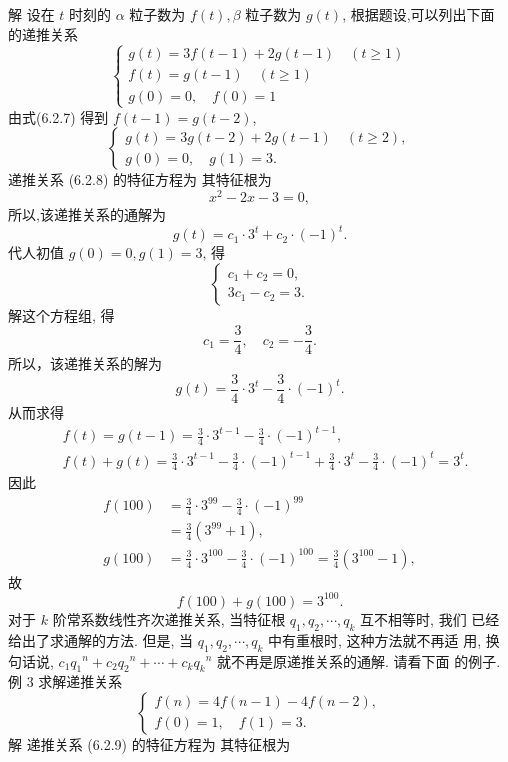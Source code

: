 \documentclass{report}
\begin{document}
	解 设在 $t$ 时刻的 $\alpha$ 粒子数为 $f(t), \beta$ 粒子数为 $g(t)$, 根据题设,可以列出下面 的递推关系
	$$
	\left\{\begin{array}{l}
	g(t)=3 f(t-1)+2 g(t-1) \quad(t \geqslant 1) \\
	f(t)=g(t-1) \quad(t \geqslant 1) \\
	g(0)=0, \quad f(0)=1
	\end{array}\right.
	$$
	由式(6.2.7) 得到
	$f(t-1)=g(t-2)$,
	$$
	\left\{\begin{array}{l}
	g(t)=3 g(t-2)+2 g(t-1) \quad(t \geqslant 2), \\
	g(0)=0, \quad g(1)=3 .
	\end{array}\right.
	$$
	递推关系 (6.2.8) 的特征方程为
	其特征根为
	$$
	x^2-2 x-3=0,
	$$
	所以,该递推关系的通解为
	$$
	g(t)=c_1 \cdot 3^t+c_2 \cdot(-1)^t .
	$$
	代人初值 $g(0)=0, g(1)=3$, 得
	$$
	\left\{\begin{array}{l}
	c_1+c_2=0, \\
	3 c_1-c_2=3 .
	\end{array}\right.
	$$
	解这个方程组, 得
	$$
	c_1=\frac{3}{4}, \quad c_2=-\frac{3}{4} .
	$$
	所以，该递推关系的解为
	$$
	g(t)=\frac{3}{4} \cdot 3^t-\frac{3}{4} \cdot(-1)^t .
	$$
	从而求得
	$$
	\begin{aligned}
	&f(t)=g(t-1)=\frac{3}{4} \cdot 3^{t-1}-\frac{3}{4} \cdot(-1)^{t-1}, \\
	&f(t)+g(t)=\frac{3}{4} \cdot 3^{t-1}-\frac{3}{4} \cdot(-1)^{t-1}+\frac{3}{4} \cdot 3^t-\frac{3}{4} \cdot(-1)^t=3^t .
	\end{aligned}
	$$
	因此
	$$
	\begin{aligned}
	f(100) &=\frac{3}{4} \cdot 3^{99}-\frac{3}{4} \cdot(-1)^{99} \\
	&=\frac{3}{4}\left(3^{99}+1\right), \\
	g(100) &=\frac{3}{4} \cdot 3^{100}-\frac{3}{4} \cdot(-1)^{100}=\frac{3}{4}\left(3^{100}-1\right),
	\end{aligned}
	$$故
	$$
	f(100)+g(100)=3^{100} .
	$$
	对于 $k$ 阶常系数线性齐次递推关系, 当特征根 $q_1, q_2, \cdots, q_k$ 互不相等时, 我们 已经给出了求通解的方法. 但是, 当 $q_1, q_2, \cdots, q_k$ 中有重根时, 这种方法就不再适 用, 换句话说, $c_1 q_1{ }^n+c_2 q_2{ }^n+\cdots+c_k q_k{ }^n$ 就不再是原递推关系的通解. 请看下面 的例子.
	例 3 求解递推关系
	$$
	\left\{\begin{array}{l}
	f(n)=4 f(n-1)-4 f(n-2), \\
	f(0)=1, \quad f(1)=3 .
	\end{array}\right.
	$$
	解 递推关系 (6.2.9) 的特征方程为
	其特征根为
\end{document}
